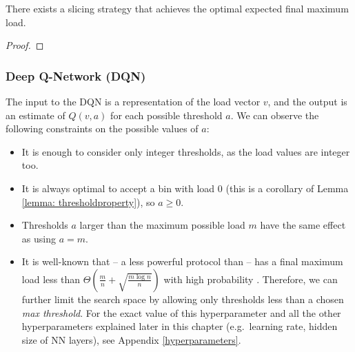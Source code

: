 \begin{lemma} \label{lemma: thresholdproperty}
There exists a slicing strategy that achieves the optimal expected final maximum load.
\end{lemma}


\begin{proof}
\end{proof}



\subsubsection{Deep Q-Network (DQN)} \label{DQN}

The input to the DQN is a representation of the load vector $v$, and the output is an estimate of $Q(v, a)$ for each possible threshold $a$. We can observe the following constraints on the possible values of $a$:

\begin{itemize}
    \item It is enough to consider only integer thresholds, as the load values are integer too.
    \item It is always optimal to accept a bin with load $0$ (this is a corollary of Lemma \ref{lemma: thresholdproperty}), so $a\geq 0$.
    \item Thresholds $a$ larger than the maximum possible load $m$ have the same effect as using $a=m$.
    \item It is well-known that \OneChoice -- a less powerful protocol than \TwoThinning -- has a final maximum load less than $\Theta (\frac{m}{n} + \sqrt{\frac{m\log n}{n}})$ with high probability \cite{raab1998onechoice}. Therefore, we can further limit the search space by allowing only thresholds less than a chosen \textit{max threshold}. For the exact value of this hyperparameter and all the other hyperparameters explained later in this chapter (e.g.\ learning rate, hidden size of NN layers), see Appendix \ref{hyperparameters}. 
    
\end{itemize}


